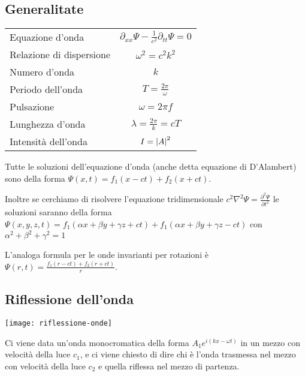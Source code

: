 \documentclass[10pt,a4paper]{article}
\begin{document}
\begin{multicols}{2}
  \subsection*{Generalitate}
  \begin{tabular}{lc}
    Equazione d'onda         & $\partial_{xx} \Psi - \frac{1}{c^2} \partial_{tt} \Psi = 0$ \\
    Relazione di dispersione & $\omega^2 = c^2 k^2$                                        \\
    Numero d'onda            & $k$                                                         \\
    Periodo dell'onda        & $T = \frac{2 \pi}{\omega}$                                  \\
    Pulsazione               & $\omega = 2 \pi f$                                          \\
    Lunghezza d'onda         & $\lambda = \frac{2 \pi}{k} = cT$                            \\
    Intensità dell'onda      & $I = \left|{A}\right|^2$                                             \\
  \end{tabular}

  \begin{paragrafo}
    Tutte le soluzioni dell'equazione d'onda (anche detta equazione di D'Alambert) sono della forma $\Psi(x, t) = f_1(x - ct) + f_2(x + ct)$.

    Inoltre se cerchiamo di risolvere l'equazione tridimensionale $c^2 \nabla^2 \Psi = \frac{\partial^2 \Psi}{\partial t^2}$ le soluzioni saranno della forma $\Psi(x, y, z, t) = f_1(\alpha x + \beta y + \gamma z + ct) + f_1(\alpha x + \beta y + \gamma z - ct)$ con $\alpha^2 + \beta^2 + \gamma^2 = 1$

    L'analoga formula per le onde invarianti per rotazioni è $\Psi(r, t) = \frac{f_1(r - ct) + f_2(r + ct)}{r}$.
  \end{paragrafo}
  
  \subsection*{Riflessione dell'onda}
  \begin{center}
    \texttt{[image: riflessione-onde]}
  \end{center}
  
  \begin{paragrafo}
    Ci viene data un'onda monocromatica della forma $A_1 e^{i(kx - \omega t)}$ in un mezzo con velocità della luce $c_1$, e ci viene chiesto di dire chi è l'onda trasmessa nel mezzo con velocità della luce $c_2$ e quella riflessa nel mezzo di partenza.


\end{paragrafo}
\end{multicols}
\end{document}
